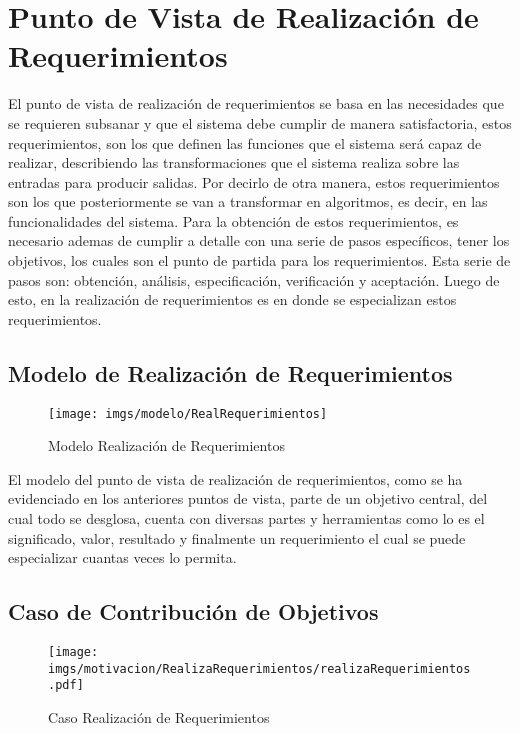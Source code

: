 \section{Punto de Vista de Realización de Requerimientos}
El punto de vista de realización de requerimientos se basa en las necesidades que se requieren subsanar y que el sistema debe cumplir de manera satisfactoria, estos requerimientos, son los que definen las funciones que el sistema será capaz de realizar, describiendo las transformaciones que el sistema realiza sobre las entradas para producir salidas. Por decirlo de otra manera, estos requerimientos son los que posteriormente se van a transformar en algoritmos, es decir, en las funcionalidades del sistema.
Para la obtención de estos requerimientos, es necesario ademas de cumplir a detalle con una serie de pasos específicos, tener los objetivos, los cuales son el punto de partida para los requerimientos. Esta serie de pasos son: obtención, análisis, especificación, verificación y aceptación. Luego de esto, en la realización de requerimientos es en donde se especializan estos requerimientos.


\subsection{Modelo de Realización de Requerimientos}
\begin{figure}[h!]
	\centering
	\texttt{[image: imgs/modelo/RealRequerimientos]}
	\caption{Modelo Realización de Requerimientos}
\end{figure}

El modelo del punto de vista de realización de requerimientos, como se ha evidenciado en los anteriores puntos de vista, parte de un objetivo central, del cual todo se desglosa, cuenta con diversas partes y herramientas como lo es el significado, valor, resultado y finalmente un requerimiento el cual se puede especializar cuantas veces lo permita.


\subsection{Caso  de Contribución de Objetivos}
\begin{figure}[h!]
	\centering
	\texttt{[image: imgs/motivacion/RealizaRequerimientos/realizaRequerimientos.pdf]}
	\caption{Caso Realización de Requerimientos}
\end{figure}


